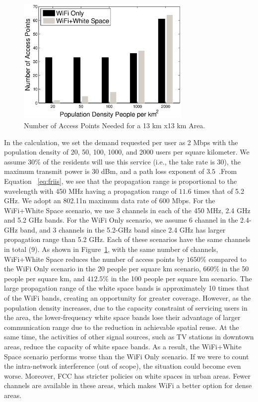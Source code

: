    \begin{figure}
   \centering
   \includegraphics[width=84mm]{figures/redensity}
   \vspace{-0.1in}
   \caption{Number of Access Points Needed for a 13 km x13 km Area.}
   \label{fig:redensity}
   \vspace{-0.3in}
   \end{figure}

In the calculation, we set the demand requested per user as 2 Mbps with the population density of 20, 50, 100, 1000, 
and 2000 users per square kilometer. We assume 30\% of the residents will use this service (i.e., the take rate is 
30), the maximum transmit power is 30 dBm, and a path loss exponent of $3.5$~\cite{meikle2012global}.From Equation
~\ref{eq:friis}, we see that the propagation range is proportional to the wavelength with 450 MHz having a propagation 
range of $11.6$ times that of 5.2 GHz. We adopt an 802.11n maximum data rate of 600 Mbps. For the WiFi+White Space 
scenario, we use 3 channels in each of the 450 MHz, 2.4 GHz and 5.2 GHz bands. For the WiFi Only scenario, we assume 
6 channel in the 2.4-GHz band, and 3 channels in the 5.2-GHz band since 2.4 GHz has larger propagation range than 5.2 GHz. 
Each of these scenarios have the same channels in total (9). As shown in Figure~\ref{fig:redensity}, with the same number 
of channels, WiFi+White Space reduces the number of access points by $1650\%$ compared to the WiFi Only scenario in the 
20 people per square km scenario, $660\%$ in the 50 people per square km, and $412.5\%$ in the 100 people per square km 
scenario. The large propagation range of the white space bands is approximately 10 times that of the WiFi bands, creating 
an opportunity for greater coverage. However, as the population density increases, due to the capacity constraint of 
servicing users in the area, the lower-frequency white space bands lose their advantage of larger communication range due 
to the reduction in achievable spatial reuse. At the same time, the activities of other signal sources, such as TV stations 
in downtown areas, reduce the capacity of white space bands. As a result, the WiFi+White Space scenario performs worse 
than the WiFi Only scenario. If we were to count the intra-network interference (out of scope), the situation could become 
even worse. Moreover, FCC has stricter policies on white spaces in urban areas. Fewer channels are available in these 
areas, which makes WiFi a better option for dense areas.

